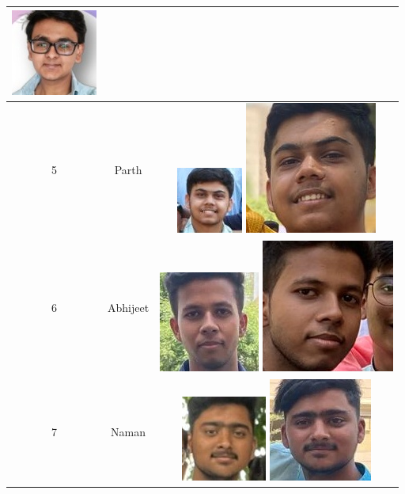 \documentclass[openany]{report}
\begin{document}
\begin{table}[H]
\begin{tabular}{|c|c|c|}
        \includegraphics[height=.15\textwidth]{../imgs/krish (66).jpg}
        \\
        \hline
        5                      & Parth         & \includegraphics[height=.15\textwidth]{../imgs/parth (1).jpg}
        \includegraphics[height=.15\textwidth]{../imgs/parth (31).jpg}
        \\
        \hline
        6                      & Abhijeet         & \includegraphics[height=.15\textwidth]{../imgs/abhijeet (3).jpg}
        \includegraphics[height=.15\textwidth]{../imgs/abhijeet (5).jpg}
        \\
        \hline
        7                      & Naman         & \includegraphics[height=.15\textwidth]{../imgs/naman (42).jpg}
        \includegraphics[height=.15\textwidth]{../imgs/naman (8).jpg}
        \\

\end{tabular}
\end{table}
\end{document}
